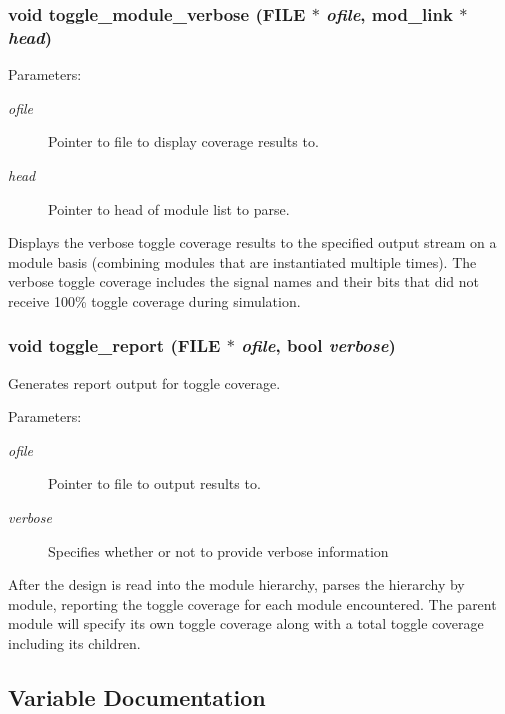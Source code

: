 \subsubsection{\setlength{\rightskip}{0pt plus 5cm}void toggle\_\-module\_\-verbose (FILE $\ast$ {\em ofile}, {\bf mod\_\-link} $\ast$ {\em head})}\label{toggle_8c_a10}


\begin{Desc}
\item[Parameters:]
\begin{description}
\item[{\em ofile}]Pointer to file to display coverage results to. \item[{\em head}]Pointer to head of module list to parse.\end{description}
\end{Desc}
Displays the verbose toggle coverage results to the specified output stream on a module basis (combining modules that are instantiated multiple times). The verbose toggle coverage includes the signal names and their bits that did not receive 100\% toggle coverage during simulation. 
\subsubsection{\setlength{\rightskip}{0pt plus 5cm}void toggle\_\-report (FILE $\ast$ {\em ofile}, {\bf bool} {\em verbose})}\label{toggle_8c_a11}


Generates report output for toggle coverage.

\begin{Desc}
\item[Parameters:]
\begin{description}
\item[{\em ofile}]Pointer to file to output results to. \item[{\em verbose}]Specifies whether or not to provide verbose information\end{description}
\end{Desc}
After the design is read into the module hierarchy, parses the hierarchy by module, reporting the toggle coverage for each module encountered. The parent module will specify its own toggle coverage along with a total toggle coverage including its children. 

\subsection{Variable Documentation}
